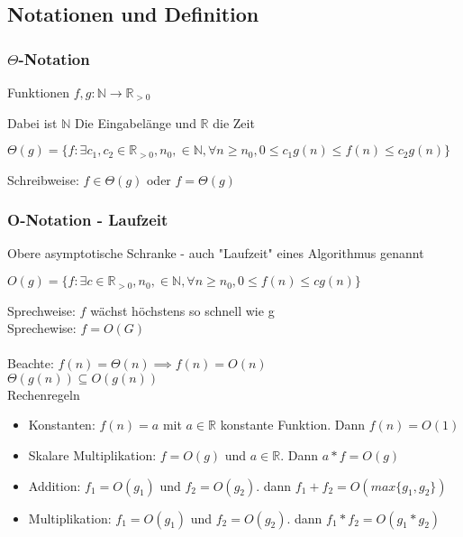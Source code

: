 	\subsection{Notationen und Definition}
		\subsubsection{$\Theta$-Notation}
			\begin{center}
				Funktionen $f, g: \mathbb{N} \rightarrow \mathbb{R}_{>0}$ \\
			\end{center}
			Dabei ist $\mathbb{N}$ Die Eingabelänge und $\mathbb{R}$ die Zeit 
			\begin{center}
				$\Theta(g) = \{f: \exists c_1 , c_2 \in \mathbb{R}_{>0}, n_0 , \in \mathbb{N}, \forall n \geq n_0 , 0 \leq c_1	 g(n) \leq f(n) \leq c_2 g(n)\}$
			\end{center}
			Schreibweise: $f \in \Theta (g)$ oder $f = \Theta (g)$

		\subsubsection{O-Notation - Laufzeit}
			Obere asymptotische Schranke - auch "Laufzeit" eines Algorithmus genannt
			\begin{center}
				$O(g) = \{f: \exists c \in \mathbb{R}_{>0}, n_0 , \in \mathbb{N}, \forall n \geq n_0 , 0 \leq f(n) \leq c g(n)\}$
			\end{center}
			Sprechweise: $f$ wächst höchstens so schnell wie g \\
			Sprechewise: $f = O(G)$ \\\\

			\noindent Beachte: $f(n) = \Theta (n) \implies f(n) = O(n)$ \\
			\indent \hspace{1.5cm} $\Theta (g(n)) \subseteq O(g(n))$ \\

			\noindent Rechenregeln
			\begin{itemize}
				\item Konstanten: $f(n) = a$ mit $a \in \mathbb{R}$ konstante Funktion. Dann $f(n) = O(1)$
				\item Skalare Multiplikation: $f = O(g)$ und $a \in \mathbb{R}$. Dann $a*f = O(g)$
				\item Addition: $f_1 = O(g_1)$ und $f_2 = O(g_2)$. dann $f_1 + f_2 = O(max\{ g_1, g_2\})$
				\item Multiplikation: $f_1 = O(g_1)$ und $f_2 = O(g_2)$. dann $f_1 * f_2 = O(g_1 * g_2)$
			\end{itemize}

